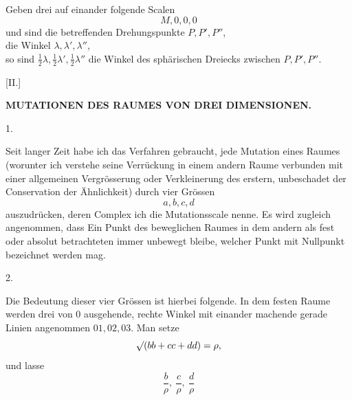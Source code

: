 \par
{}%
Geben drei auf einander folgende Scalen
\[
M,0,0,0
\]
und sind die betreffenden Drehungspunkte $P,P',P''$,\\
\hspace*{5em}die Winkel $\lambda,\lambda',\lambda''$,\\
so sind $\tfrac12\lambda,\tfrac12\lambda',\tfrac12\lambda''$ die Winkel des sphärischen Dreiecks zwischen $P,P',P''$.

\begin{center}[II.]\end{center}
\begin{center}\bfseries MUTATIONEN DES RAUMES VON DREI DIMENSIONEN.\end{center}
\begin{center}1.\end{center}

Seit langer Zeit habe ich das Verfahren gebraucht, jede Mutation eines Raumes (worunter ich verstehe seine Verrückung in einem andern Raume verbunden mit einer allgemeinen Vergrösserung oder Verkleinerung des erstern, unbeschadet der Conservation der Ähnlichkeit) durch vier Grössen
\[
a,b,c,d
\]
auszudrücken, deren Complex ich die Mutationsscale nenne. Es wird zugleich angenommen, dass Ein Punkt des beweglichen Raumes in dem andern als fest oder absolut betrachteten immer unbewegt bleibe, welcher Punkt mit Nullpunkt bezeichnet werden mag.

\begin{center}2.\end{center}

Die Bedeutung dieser vier Grössen ist hierbei folgende. In dem festen Raume werden drei von $0$ ausgehende, rechte Winkel mit einander machende gerade Linien angenommen $01,02,03$. Man setze
\[
\mathord{\surd}(bb+cc+dd)=\rho,
\]
und lasse
\[
\frac b\rho,\ \frac c\rho,\ \frac d\rho
\]
